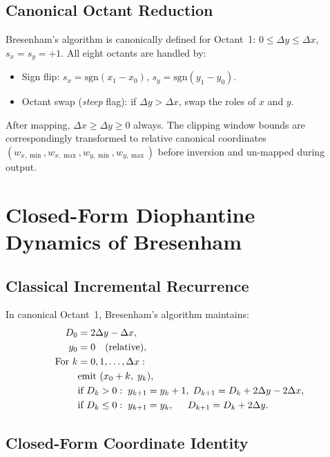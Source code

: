 \documentclass[12pt,a4paper]{article}
\theoremstyle{definition}
\newcommand{\dx}{\Delta x}
\newcommand{\dy}{\Delta y}
\begin{document}
\subsection{Canonical Octant Reduction}

Bresenham's algorithm is canonically defined for Octant~1:
$0 \le \dy \le \dx$, $s_x = s_y = +1$. All eight octants
are handled by:
\begin{itemize}
  \item Sign flip: $s_x = \mathrm{sgn}(x_1 - x_0)$,
    $s_y = \mathrm{sgn}(y_1 - y_0)$.
  \item Octant swap (\emph{steep} flag): if $\dy > \dx$,
    swap the roles of $x$ and $y$.
\end{itemize}

After mapping, $\dx \ge \dy \ge 0$ always. The clipping
window bounds are correspondingly transformed to relative
canonical coordinates $(w_{x,\min}, w_{x,\max},
w_{y,\min}, w_{y,\max})$ before inversion and un-mapped
during output.

\section{Closed-Form Diophantine Dynamics of Bresenham}
\label{sec:math}

\subsection{Classical Incremental Recurrence}

In canonical Octant~1, Bresenham's algorithm maintains:
\begin{align}
  D_0 &= 2\dy - \dx, \label{eq:D0}\\
  y_0 &= 0 \quad\text{(relative)},\notag\\
  \text{For } k &= 0, 1, \ldots, \dx:\notag\\
    &\text{emit } (x_0 + k,\; y_k),\notag\\
    &\text{if } D_k > 0:\; y_{k+1} = y_k + 1,\; D_{k+1} = D_k + 2\dy - 2\dx,\label{eq:step_up}\\
    &\text{if } D_k \le 0:\; y_{k+1} = y_k,\quad\;\,D_{k+1} = D_k + 2\dy.\label{eq:step_flat}
\end{align}

\subsection{Closed-Form Coordinate Identity}
\end{document}

